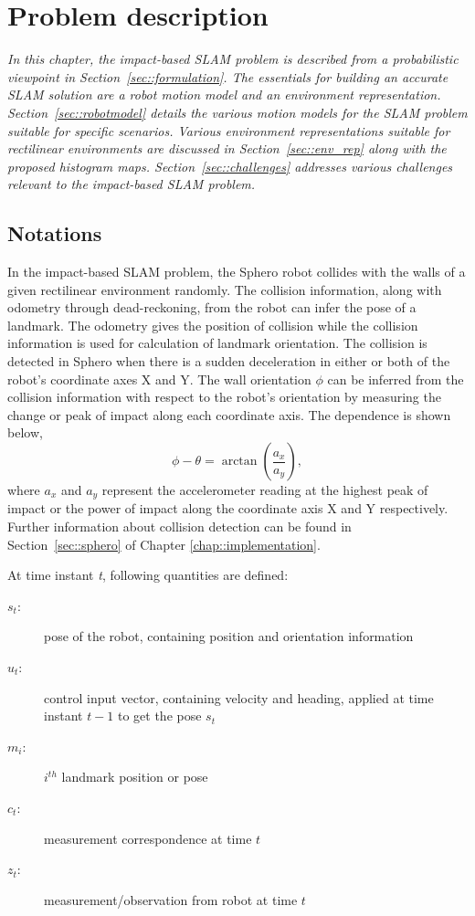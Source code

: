 \chapter{Problem description} \label{chap::problem}
{\it \centering In this chapter, the impact-based SLAM problem is described from a probabilistic viewpoint in Section~\ref{sec::formulation}. The essentials for building an accurate SLAM solution are a robot motion model and an environment representation. Section~\ref{sec::robotmodel} details the various motion models for the SLAM problem suitable for specific scenarios. Various environment representations suitable for rectilinear environments are discussed in Section~\ref{sec::env_rep} along with the proposed histogram maps. Section~\ref{sec::challenges} addresses various challenges relevant to the impact-based SLAM problem.}

\section{Notations}
In the impact-based SLAM problem, the Sphero robot collides with the walls of a given rectilinear environment randomly. The collision information, along with odometry through dead-reckoning, from the robot can infer the pose of a landmark. The odometry gives the position of collision while the collision information is used for calculation of landmark orientation. The collision is detected in Sphero when there is a sudden deceleration in either or both of the robot's coordinate axes X and Y. The wall orientation $\phi$ can be inferred from the collision information with respect to the robot's orientation  by measuring the change or peak of impact along each coordinate axis. The dependence is shown below,
\begin{equation}
\phi-\theta = \arctan\left(\frac{a_x}{a_y}\right),
\end{equation}
where $a_x$ and $a_y$ represent the accelerometer reading at the highest peak of impact or the power of impact along the coordinate axis X and Y respectively. Further information about collision detection can be found in Section~\ref{sec::sphero} of Chapter \ref{chap::implementation}. 

At time instant \textit{t}, following quantities are defined:
\begin{description}
\item[$s_t:$] pose of the robot, containing position and orientation information
\item[$u_t:$] control input vector, containing velocity and heading, applied at time instant $\textit{t}-1$ to get the pose $s_t$
\item[$m_i:$] $i^{th}$ landmark position or pose
\item[$c_t:$] measurement correspondence at time $t$
\item[$z_t:$] measurement/observation from robot at time $t$
\end{description}

